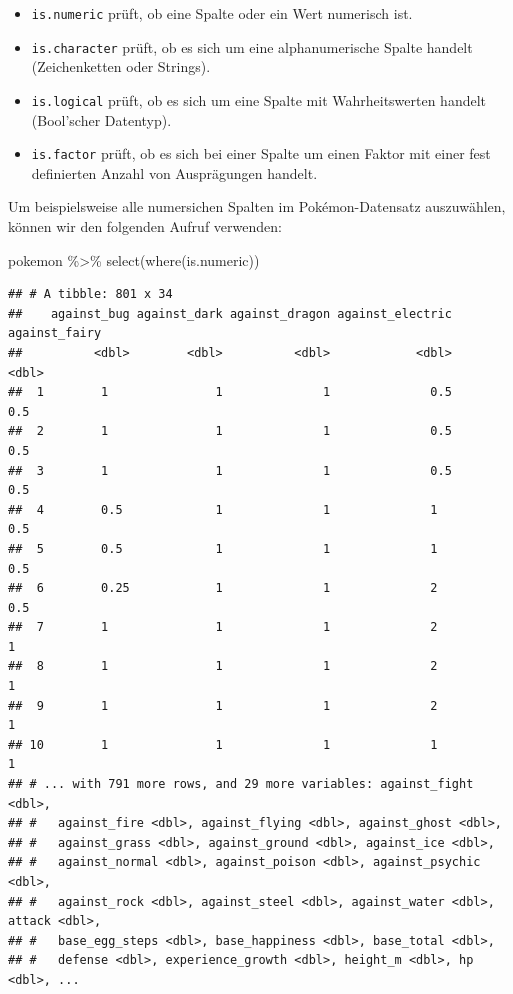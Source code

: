 \documentclass[
]{book}
\newenvironment{Shaded}{\begin{snugshade}}{\end{snugshade}}
\newcommand{\FunctionTok}[1]{\textcolor[rgb]{0.00,0.00,0.00}{#1}}
\newcommand{\NormalTok}[1]{#1}
\newcommand{\SpecialCharTok}[1]{\textcolor[rgb]{0.00,0.00,0.00}{#1}}
\providecommand{\tightlist}{%
  \setlength{\itemsep}{0pt}\setlength{\parskip}{0pt}}
\begin{document}
\begin{itemize}
\tightlist
\item
  \texttt{is.numeric} prüft, ob eine Spalte oder ein Wert numerisch ist.
\item
  \texttt{is.character} prüft, ob es sich um eine alphanumerische Spalte handelt (Zeichenketten oder Strings).
\item
  \texttt{is.logical} prüft, ob es sich um eine Spalte mit Wahrheitswerten handelt (Bool'scher Datentyp).
\item
  \texttt{is.factor} prüft, ob es sich bei einer Spalte um einen Faktor mit einer fest definierten Anzahl von Ausprägungen handelt.
\end{itemize}

Um beispielsweise alle numersichen Spalten im Pokémon-Datensatz auszuwählen, können wir den folgenden Aufruf verwenden:

\begin{Shaded}
\begin{Highlighting}[]
\NormalTok{pokemon }\SpecialCharTok{\%\textgreater{}\%} 
  \FunctionTok{select}\NormalTok{(}\FunctionTok{where}\NormalTok{(is.numeric))}
\end{Highlighting}
\end{Shaded}

\begin{verbatim}
## # A tibble: 801 x 34
##    against_bug against_dark against_dragon against_electric against_fairy
##          <dbl>        <dbl>          <dbl>            <dbl>         <dbl>
##  1        1               1              1              0.5           0.5
##  2        1               1              1              0.5           0.5
##  3        1               1              1              0.5           0.5
##  4        0.5             1              1              1             0.5
##  5        0.5             1              1              1             0.5
##  6        0.25            1              1              2             0.5
##  7        1               1              1              2             1  
##  8        1               1              1              2             1  
##  9        1               1              1              2             1  
## 10        1               1              1              1             1  
## # ... with 791 more rows, and 29 more variables: against_fight <dbl>,
## #   against_fire <dbl>, against_flying <dbl>, against_ghost <dbl>,
## #   against_grass <dbl>, against_ground <dbl>, against_ice <dbl>,
## #   against_normal <dbl>, against_poison <dbl>, against_psychic <dbl>,
## #   against_rock <dbl>, against_steel <dbl>, against_water <dbl>, attack <dbl>,
## #   base_egg_steps <dbl>, base_happiness <dbl>, base_total <dbl>,
## #   defense <dbl>, experience_growth <dbl>, height_m <dbl>, hp <dbl>, ...
\end{verbatim}
\end{document}

